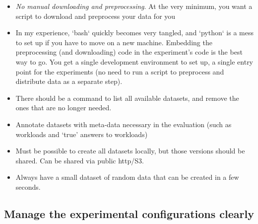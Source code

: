 \documentclass{llncs}
\begin{document}
\begin{itemize}
\item \emph{No manual downloading and preprocessing}. At the very minimum, you want a
  script to download and preprocess your data for you
\item In my experience, `bash` quickly becomes very tangled, and `python` is a mess
  to set up if you have to move on a new machine. Embedding the preprocessing
  (and downloading) code in the experiment's code is the best way to go. You
  get a single development environment to set up, a single entry point for the
  experiments (no need to run a script to preprocess and distribute data as a
  separate step).
\item There should be a command to list all available datasets, and remove the ones
  that are no longer needed.
\item Annotate datasets with meta-data necessary in the evaluation (such as workloads and `true' answers to workloads) 
\item Must be possible to create all datasets locally, but those versions should be shared. Can be shared via public http/S3.
\item Always have a small dataset of random data that can be created in a few seconds.
\end{itemize}


\subsection{Manage the experimental configurations clearly}
\end{document}
